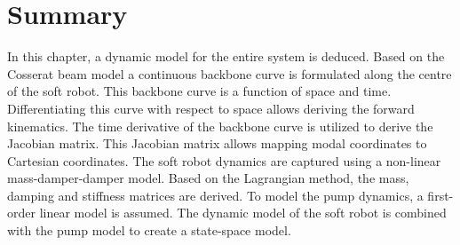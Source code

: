 \section*{Summary}

In this chapter, a dynamic model for the entire system is deduced. Based on the Cosserat beam model a continuous backbone curve is formulated along the centre of the soft robot. This backbone curve is a function of space and time. Differentiating this curve with respect to space allows deriving the forward kinematics. The time derivative of the backbone curve is utilized to derive the Jacobian matrix. This Jacobian matrix allows mapping modal coordinates to Cartesian coordinates. The soft robot dynamics are captured using a non-linear mass-damper-damper model. Based on the Lagrangian method, the mass, damping and stiffness matrices are derived. To model the pump dynamics, a first-order linear model is assumed. The dynamic model of the soft robot is combined with the pump model to create a state-space model. 









